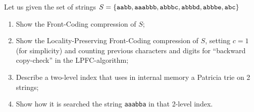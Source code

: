 \exercise

Let us given the set of strings $S = \{ \text{\tt aabb}, \text{\tt aaabbb},
\text{\tt abbbc}, \text{\tt abbbd}, \text{\tt abbbe}, \text{\tt abc} \}$
%
\begin{enumerate}
    \item Show the Front-Coding compression of $S$;

    \item Show the Locality-Preserving Front-Coding compression of $S$, setting
    $c = 1$ (for simplicity) and counting previous characters and digits for
    ``backward copy-check'' in the LPFC-algorithm;

    \item Describe a two-level index that uses in internal memory a Patricia
    trie on 2 strings;

    \item Show how it is searched the string {\tt aaabba} in that 2-level index.

\end{enumerate}

\solution

